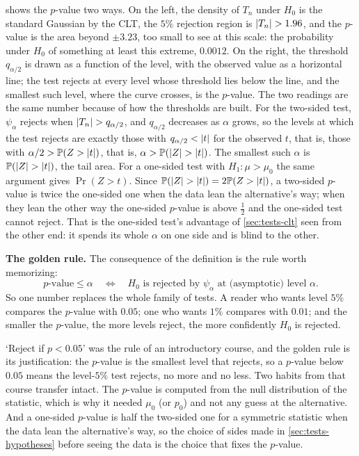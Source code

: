  shows the $p$-value two ways.
On the left, the density of $T_n$ under $H_0$ is the standard Gaussian by the CLT, the $5\%$ rejection region is $\lvert T_n\rvert > 1.96$, and the $p$-value is the area beyond $\pm 3.23$, too small to see at this scale: the probability under $H_0$ of something at least this extreme, $0.0012$.
On the right, the threshold $q_{\alpha/2}$ is drawn as a function of the level, with the observed value as a horizontal line; the test rejects at every level whose threshold lies below the line, and the smallest such level, where the curve crosses, is the $p$-value.
The two readings are the same number because of how the thresholds are built.
For the two-sided test, $\psi_\alpha$ rejects when $\lvert T_n\rvert > q_{\alpha/2}$, and $q_{\alpha/2}$ decreases as $\alpha$ grows, so the levels at which the test rejects are exactly those with $q_{\alpha/2} < \lvert t\rvert$ for the observed $t$, that is, those with $\alpha/2 > \mathbb{P}(Z > \lvert t\rvert)$, that is, $\alpha > \mathbb{P}(\lvert Z\rvert > \lvert t\rvert)$.
The smallest such $\alpha$ is $\mathbb{P}(\lvert Z\rvert > \lvert t\rvert)$, the tail area.
For a one-sided test with $H_1: \mu > \mu_0$ the same argument gives $\Pr(Z > t)$.
Since $\mathbb{P}(\lvert Z\rvert > \lvert t\rvert) = 2\mathbb{P}(Z > \lvert t\rvert)$, a two-sided $p$-value is twice the one-sided one when the data lean the alternative's way; when they lean the other way the one-sided $p$-value is above $\frac12$ and the one-sided test cannot reject. That is the one-sided test's advantage of \cref{sec:tests-clt} seen from the other end: it spends its whole $\alpha$ on one side and is blind to the other.

\textbf{The golden rule.}
The consequence of the definition is the rule worth memorizing:
\[
p\text{-value} \leq \alpha \quad \Longleftrightarrow \quad H_0 \text{ is rejected by } \psi_\alpha \text{ at (asymptotic) level } \alpha.
\]
So one number replaces the whole family of tests.
A reader who wants level $5\%$ compares the $p$-value with $0.05$; one who wants $1\%$ compares with $0.01$; and the smaller the $p$-value, the more levels reject, the more confidently $H_0$ is rejected.

\begin{bridge}[$p < 0.05$]
`Reject if $p < 0.05$' was the rule of an introductory course, and the golden rule is its justification: the $p$-value is the smallest level that rejects, so a $p$-value below $0.05$ means the level-$5\%$ test rejects, no more and no less.
Two habits from that course transfer intact. The $p$-value is computed from the null distribution of the statistic, which is why it needed $\mu_0$ (or $p_0$) and not any guess at the alternative. And a one-sided $p$-value is half the two-sided one for a symmetric statistic when the data lean the alternative's way, so the choice of sides made in \cref{sec:tests-hypotheses} before seeing the data is the choice that fixes the $p$-value.
\end{bridge}

